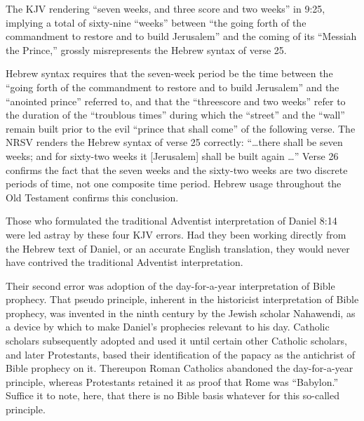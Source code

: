 The KJV rendering ``seven weeks, and three score and two weeks'' in 9:25,
implying a total of sixty-nine ``weeks'' between ``the going forth of the
commandment to restore and to build Jerusalem'' and the coming of its
``Messiah the Prince,'' grossly misrepresents the Hebrew syntax of verse 25.

Hebrew syntax requires that the seven-week period be the time between the
``going forth of the commandment to restore and to build Jerusalem'' and the
``anointed prince'' referred to, and that the ``threescore and two weeks'' refer
to the duration of the ``troublous times'' during which the ``street'' and the
``wall'' remain built prior to the evil ``prince that shall come'' of the
following verse. The NRSV renders the Hebrew syntax of verse 25 correctly:
``\ldots there shall be seven weeks; and for sixty-two weeks it [Jerusalem]
shall be built again \ldots'' Verse 26 confirms the fact that the seven weeks
and the sixty-two weeks are two discrete periods of time, not one composite
time period. Hebrew usage throughout the Old Testament confirms this
conclusion.

Those who formulated the traditional Adventist interpretation of Daniel 8:14
were led astray by these four KJV errors. Had they been working directly
from the Hebrew text of Daniel, or an accurate English translation, they
would never have contrived the traditional Adventist interpretation.

Their second error was adoption of the day-for-a-year interpretation of
Bible prophecy. That pseudo principle, inherent in the historicist
interpretation of Bible prophecy, was invented in the ninth century by the
Jewish scholar Nahawendi, as a device by which to make Daniel's prophecies
relevant to his day. Catholic scholars subsequently adopted and used it
until certain other Catholic scholars, and later Protestants, based
their identification of the papacy as the antichrist of Bible prophecy on
it. Thereupon Roman Catholics abandoned the day-for-a-year principle,
whereas Protestants retained it as proof that Rome was ``Babylon.'' Suffice it
to note, here, that there is no Bible basis whatever for this so-called
principle.

